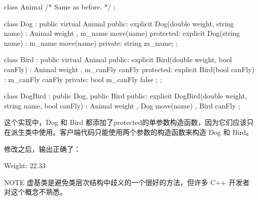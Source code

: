 \begin{cpp}
class Animal { /* Same as before. */ };

class Dog : public virtual Animal
{
    public:
        explicit Dog(double weight, string name)
            : Animal { weight }, m_name { move(name) } {}
    protected:
        explicit Dog(string name) : m_name { move(name) } {}
    private:
        string m_name;
};

class Bird : public virtual Animal
{
    public:
        explicit Bird(double weight, bool canFly)
            : Animal { weight }, m_canFly { canFly } {}
    protected:
        explicit Bird(bool canFly) : m_canFly { canFly } {}
    private:
        bool m_canFly { false };
};

class DogBird : public Dog, public Bird
{
    public:
        explicit DogBird(double weight, string name, bool canFly)
            : Animal { weight }, Dog { move(name) }, Bird { canFly } {}
};
\end{cpp}

这个实现中，Dog 和 Bird 都添加了protected的单参数构造函数，因为它们应该只在派生类中使用。客户端代码只能使用两个参数的构造函数来构造 Dog 和 Bird。

修改之后，输出正确了：

\begin{shell}
Weight: 22.33
\end{shell}

\begin{myNotic}{NOTE}
虚基类是避免类层次结构中歧义的一个很好的方法，但许多 C++ 开发者对这个概念不熟悉。
\end{myNotic}










